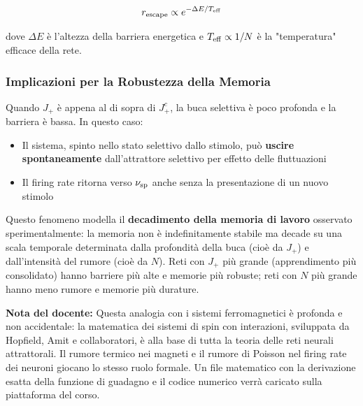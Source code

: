 \begin{equation}
r_{\rm escape} \propto e^{-\Delta E / T_{\rm eff}}
\end{equation}

dove $\Delta E$ è l'altezza della barriera energetica e $T_{\rm eff} \propto 1/N$ è la "temperatura" efficace della rete.

\subsubsection{Implicazioni per la Robustezza della Memoria}

Quando $J_+$ è appena al di sopra di $J_+^c$, la buca selettiva è poco profonda e la barriera è bassa. In questo caso:

\begin{itemize}
    \item Il sistema, spinto nello stato selettivo dallo stimolo, può \textbf{uscire spontaneamente} dall'attrattore selettivo per effetto delle fluttuazioni
    \item Il firing rate ritorna verso $\nu_{\rm sp}$ anche senza la presentazione di un nuovo stimolo
\end{itemize}

Questo fenomeno modella il \textbf{decadimento della memoria di lavoro} osservato sperimentalmente: la memoria non è indefinitamente stabile ma decade su una scala temporale determinata dalla profondità della buca (cioè da $J_+$) e dall'intensità del rumore (cioè da $N$). Reti con $J_+$ più grande (apprendimento più consolidato) hanno barriere più alte e memorie più robuste; reti con $N$ più grande hanno meno rumore e memorie più durature.

\begin{tcolorbox}[colback=gray!5, colframe=gray!40, arc=2mm, boxrule=0.5pt]
\textbf{Nota del docente:} Questa analogia con i sistemi ferromagnetici è profonda e non accidentale: la matematica dei sistemi di spin con interazioni, sviluppata da Hopfield, Amit e collaboratori, è alla base di tutta la teoria delle reti neurali attrattorali. Il rumore termico nei magneti e il rumore di Poisson nel firing rate dei neuroni giocano lo stesso ruolo formale. Un file matematico con la derivazione esatta della funzione di guadagno e il codice numerico verrà caricato sulla piattaforma del corso.
\end{tcolorbox}
